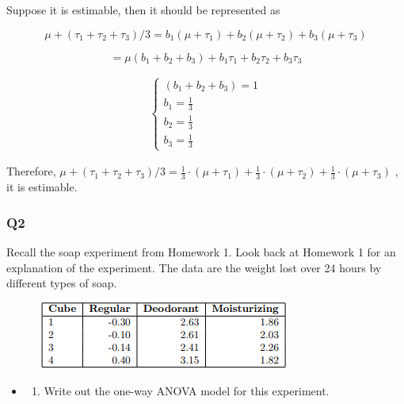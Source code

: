 \documentclass[11pt]{article}
\makeatletter
\def\maxwidth{\ifdim\Gin@nat@width>\linewidth\linewidth
    \else\Gin@nat@width\fi}
\let\Oldincludegraphics\includegraphics
\renewcommand{\includegraphics}[1]{\Oldincludegraphics[width=.8\maxwidth]{#1}}
\providecommand{\tightlist}{%
      \setlength{\itemsep}{0pt}\setlength{\parskip}{0pt}}
\makeatother
\begin{document}
Suppose it is estimable, then it should be represented as

\[\mu + (\tau_1 + \tau_2 + \tau_3) /3 = b_1 (\mu + \tau_1) + b_2 (\mu + \tau_2) + b_3 (\mu + \tau_3)\]

\[= \mu (b_1+b_2+b_3) + b_1 \tau_1 + b_2 \tau_2 + b_3 \tau_3\]

\begin{align}
\left\{\begin{matrix} (b_1+b_2+b_3) =1
\\ b_1 = \frac{1}{3}
\\ b_2 = \frac{1}{3}
\\ b_3 = \frac{1}{3}
\end{matrix}\right.
\end{align}

Therefore,
\(\mu + (\tau_1 + \tau_2 + \tau_3) /3 = \frac{1}{3} \cdot (\mu + \tau_1) + \frac{1}{3} \cdot (\mu + \tau_2) + \frac{1}{3} \cdot (\mu + \tau_3)\)
, it is estimable.

    \subsubsection*{Q2}\label{q2}

    Recall the soap experiment from Homework 1. Look back at Homework 1 for
an explanation of the experiment. The data are the weight lost over 24
hours by different types of soap.

\begin{figure}[H]
\centering
\includegraphics{table.png}
\caption{}
\end{figure}

    \begin{itemize}
\item
  \begin{enumerate}
  \def\labelenumi{(\alph{enumi})}
  \tightlist
  \item
    Write out the one-way ANOVA model for this experiment.
  \end{enumerate}
\end{itemize}
\end{document}
